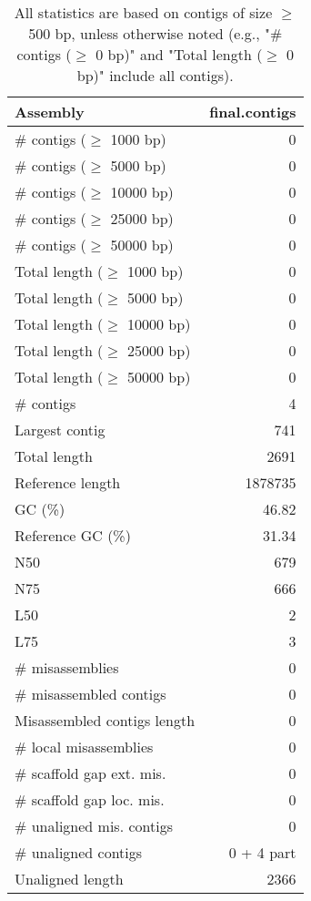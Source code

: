 \documentclass[12pt,a4paper]{article}
\begin{document}
\begin{table}[ht]
\begin{center}
\caption{All statistics are based on contigs of size $\geq$ 500 bp, unless otherwise noted (e.g., "\# contigs ($\geq$ 0 bp)" and "Total length ($\geq$ 0 bp)" include all contigs).}
\begin{tabular}{|l*{1}{|r}|}
\hline
Assembly & final.contigs \\ \hline
\# contigs ($\geq$ 1000 bp) & 0 \\ \hline
\# contigs ($\geq$ 5000 bp) & 0 \\ \hline
\# contigs ($\geq$ 10000 bp) & 0 \\ \hline
\# contigs ($\geq$ 25000 bp) & 0 \\ \hline
\# contigs ($\geq$ 50000 bp) & 0 \\ \hline
Total length ($\geq$ 1000 bp) & 0 \\ \hline
Total length ($\geq$ 5000 bp) & 0 \\ \hline
Total length ($\geq$ 10000 bp) & 0 \\ \hline
Total length ($\geq$ 25000 bp) & 0 \\ \hline
Total length ($\geq$ 50000 bp) & 0 \\ \hline
\# contigs & 4 \\ \hline
Largest contig & 741 \\ \hline
Total length & 2691 \\ \hline
Reference length & 1878735 \\ \hline
GC (\%) & 46.82 \\ \hline
Reference GC (\%) & 31.34 \\ \hline
N50 & 679 \\ \hline
N75 & 666 \\ \hline
L50 & 2 \\ \hline
L75 & 3 \\ \hline
\# misassemblies & 0 \\ \hline
\# misassembled contigs & 0 \\ \hline
Misassembled contigs length & 0 \\ \hline
\# local misassemblies & 0 \\ \hline
\# scaffold gap ext. mis. & 0 \\ \hline
\# scaffold gap loc. mis. & 0 \\ \hline
\# unaligned mis. contigs & 0 \\ \hline
\# unaligned contigs & 0 + 4 part \\ \hline
Unaligned length & 2366 \\ \hline

\end{tabular}
\end{center}
\end{table}
\end{document}
